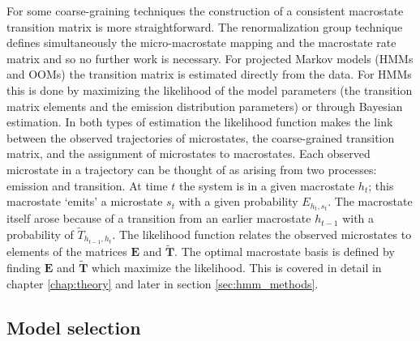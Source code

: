 For some coarse-graining techniques the construction of a consistent macrostate transition matrix is more straightforward. The renormalization group technique \cite{orioliDimensionalReductionMarkov2016c} defines simultaneously the micro-macrostate mapping and the macrostate rate matrix and so no further work is necessary. For projected Markov models (HMMs and OOMs) the transition matrix is estimated directly from the data. For HMMs this is done by maximizing the likelihood of the model parameters (the transition matrix elements and the emission distribution parameters) or through Bayesian estimation. In both types of estimation the likelihood function makes the link between the observed trajectories of microstates, the coarse-grained transition matrix, and the assignment of microstates to macrostates.  Each observed microstate in a trajectory can be thought of as arising from two processes: emission and transition. At time $t$ the system is in a given macrostate $h_{t}$; this macrostate `emits' a microstate $s_{t}$ with a given probability $E_{h_{t}, s_{t}}$.  The macrostate itself arose because of a transition from an earlier macrostate $h_{t-1}$ with a probability of $\widetilde{T}_{h_{t-1}, h_{t}}$. The likelihood function relates the observed microstates to elements of the matrices  $\mathbf{E}$ and $\widetilde{\mathbf{T}}$. The optimal macrostate basis is defined by finding $\mathbf{E}$ and $\widetilde{\mathbf{T}}$ which maximize the likelihood. This is covered in detail in chapter \ref{chap:theory} and later in section \ref{sec:hmm_methods}.


\subsection{Model selection}

